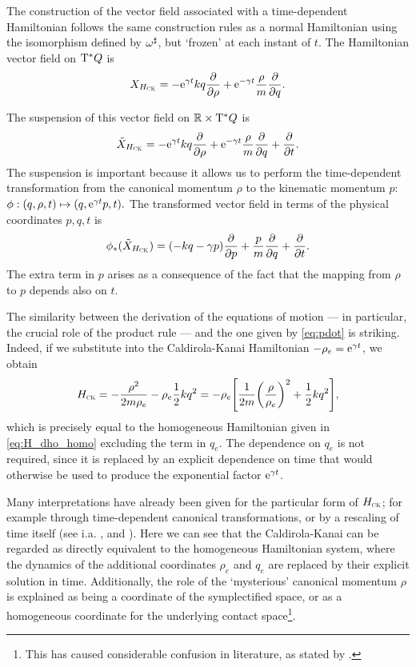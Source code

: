 The construction of the vector field associated with a time-dependent Hamiltonian follows the same construction rules as a normal Hamiltonian using the isomorphism defined by \(\omega^\sharp\), but `frozen' at each instant of \(t\). The Hamiltonian vector field on \(\mathrm{T}^*Q\) is
\begin{equation}
     X_{H_\text{\tiny{\textsc{CK}}}} = -\mathrm{e}^{\gamma t}kq\pdv{}{\ensuremath{\rho}} + \mathrm{e}^{-\gamma t}\frac{\rho}{m}\pdv{}{q}.
\end{equation}

The suspension of this vector field on \(\mathbb{R} \times \mathrm{T}^*Q\) is
\begin{equation}
     \tilde{X}_{H_\text{\tiny{\textsc{CK}}}} = -\mathrm{e}^{\gamma t}kq\pdv{}{\ensuremath{\rho}} + \mathrm{e}^{-\gamma t}\frac{\rho}{m}\pdv{}{q} + \pdv{}{t}.
\end{equation}
The suspension is important because it allows us to perform the time-dependent transformation from the canonical momentum \(\rho\) to the kinematic momentum \(p\):
\(\phi: (q, \rho, t) \mapsto (q, \mathrm{e}^{\gamma t}p, t).\)
The transformed vector field in terms of the physical coordinates \(p, q, t\) is
\begin{equation}
     \phi_*(\tilde{X}_{H_\text{\tiny{\textsc{CK}}}}) = \qty(-kq - \gamma p)\pdv{}{p} + \frac{p}{m}\pdv{}{q} + \pdv{}{t}.
\end{equation}
The extra term in \(p\) arises as a consequence of the fact that the mapping from \(\rho\) to \(p\) depends also on \(t\). 

The similarity between the derivation of the equations of motion --- in particular, the crucial role of the product rule --- and the one given by \cref{eq:pdot} is striking. Indeed, if we substitute into the Caldirola-Kanai Hamiltonian \(-\rho_e = \mathrm{e}^{\gamma t}\), we obtain
\begin{equation}
     H_\text{\tiny{\textsc{CK}}} = -\frac{\rho^2}{2m\rho_e} - \rho_e \frac{1}{2}kq^2 = -\rho_e \qty[\frac{1}{2m}\qty(\frac{\rho}{\rho_e})^2 + \frac{1}{2}kq^2],
\end{equation}
which is precisely equal to the homogeneous Hamiltonian given in \cref{eq:H_dho_homo} excluding the term in \(q_e\). The dependence on \(q_e\) is not required, since it is replaced by an explicit dependence on time that would otherwise be used to produce the exponential factor \(\mathrm{e}^{\gamma t}\). 

Many interpretations have already been given for the particular form of \(H_\text{\tiny{\textsc{CK}}}\); for example through time-dependent canonical transformations, or by a rescaling of time itself (see i.a. \citet{Tokieda2021}, \citet{Caldirola1941} and \citet{Bravetti2017}). Here we can see that the Caldirola-Kanai can be regarded as  directly equivalent to the homogeneous Hamiltonian system, where the dynamics of the additional coordinates \(\rho_e\) and \(q_e\) are replaced by their explicit solution in time. Additionally, the role of the `mysterious' canonical momentum \(\rho\) is explained as being a coordinate of the symplectified space, or as a homogeneous coordinate for the underlying contact space\footnote{This has caused considerable confusion in literature, as stated by \citet{Schuch1997}.}.

